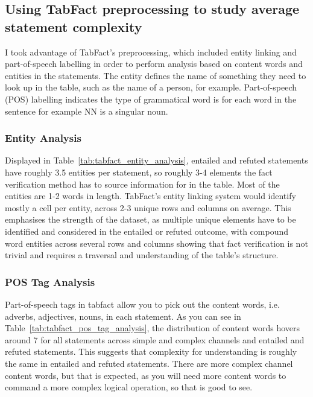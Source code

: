 \subsection{Using TabFact preprocessing to study average statement complexity}
I took advantage of TabFact’s preprocessing, which included entity linking and part-of-speech labelling in order to perform analysis based on content words and entities in the statements. The entity defines the name of something they need to look up in the table, such as the name of a person, for example. Part-of-speech (POS) labelling  indicates the type of grammatical word is for each word in the sentence for example NN is a singular noun. 

\subsubsection{Entity Analysis}
Displayed in Table~\ref{tab:tabfact_entity_analysis}, entailed and refuted statements have roughly 3.5 entities per statement, so roughly 3-4 elements the fact verification method has to source information for in the table. Most of the entities are 1-2 words in length. TabFact’s entity linking system would identify mostly a cell per entity, across 2-3 unique rows and columns on average. This emphasises the strength of the dataset, as multiple unique elements have to be identified and considered in the entailed or refuted outcome, with compound word entities across several rows and columns showing that fact verification is not trivial and requires a traversal and understanding of the table’s structure.


\subsubsection{POS Tag Analysis}
Part-of-speech tags in tabfact allow you to pick out the content words, i.e. adverbs, adjectives, nouns, in each statement. As you can see in Table~\ref{tab:tabfact_pos_tag_analysis}, the distribution of content words hovers around 7 for all statements across simple and complex channels and entailed and refuted statements. This suggests that complexity for understanding is roughly the same in entailed and refuted statements. There are more complex channel content words, but that is expected, as you will need more content words to command a more complex logical operation, so that is good to see. 


